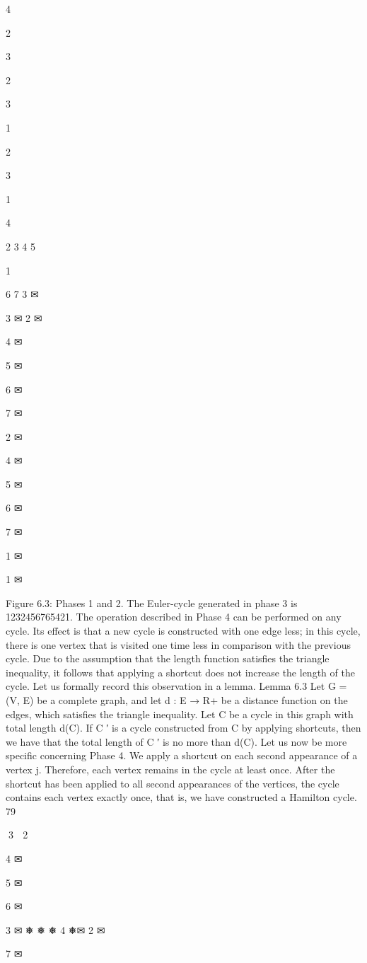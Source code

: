 4

2

3

2

3

1

2

3

1

4

2
3
4
5

1

6
7
3 ✉

3 ✉
2 ✉

4
✉

5
✉

6
✉

7
✉

2 ✉

4
✉

5
✉

6
✉

7
✉

1 ✉

1 ✉

Figure 6.3: Phases 1 and 2.
The Euler-cycle generated in phase 3 is 1232456765421.
The operation described in Phase 4 can be performed on any cycle. Its effect is that a new cycle is
constructed with one edge less; in this cycle, there is one vertex that is visited one time less in comparison
with the previous cycle. Due to the assumption that the length function satisfies the triangle inequality,
it follows that applying a shortcut does not increase the length of the cycle. Let us formally record this
observation in a lemma.
Lemma 6.3 Let G = (V, E) be a complete graph, and let d : E → R+ be a distance function on the
edges, which satisfies the triangle inequality. Let C be a cycle in this graph with total length d(C). If C ′
is a cycle constructed from C by applying shortcuts, then we have that the total length of C ′ is no more
than d(C).
Let us now be more specific concerning Phase 4. We apply a shortcut on each second appearance of a
vertex j. Therefore, each vertex remains in the cycle at least once. After the shortcut has been applied
to all second appearances of the vertices, the cycle contains each vertex exactly once, that is, we have
constructed a Hamilton cycle.
79

3 ✉
2 ✉

4
✉

5
✉

6
✉

3 ✉
❅
❅
❅ 4
❅✉
2 ✉

7
✉

